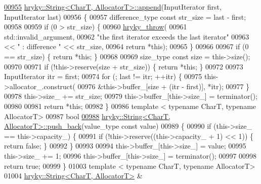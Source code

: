 \begin{DoxyCode}
\hypertarget{string_8h_source_l00955}{}\hyperlink{classhryky_1_1_string_a6ef06ff34990a702f16c422d8080e40d}{00955} \hyperlink{classhryky_1_1_string}{hryky::String<CharT, AllocatorT>::append}(InputIterator first, InputIterator 
      last)
00956 \{
00957     difference\_type \textcolor{keyword}{const} str\_size = last - first;
00958 
00959     \textcolor{keywordflow}{if} (0 > str\_size) \{
00960         \hyperlink{debug__common_8h_af50606eac4009921527ddcaed392b2c2}{hryky_throw}(
00961             std::invalid\_argument,
00962             \textcolor{stringliteral}{"the first iterator exceeds the last iterator"}
00963             << \textcolor{stringliteral}{" : difference "} << str\_size,
00964             \textcolor{keywordflow}{return} *\textcolor{keyword}{this});
00965     \}
00966     
00967     \textcolor{keywordflow}{if} (0 == str\_size) \{ \textcolor{keywordflow}{return} *\textcolor{keyword}{this}; \}
00968 
00969     size\_type \textcolor{keyword}{const} size = this->size();
00970 
00971     \textcolor{keywordflow}{if} (!this->reserve(size + str\_size)) \{ \textcolor{keywordflow}{return} *\textcolor{keyword}{this}; \}
00972 
00973     InputIterator itr = first;
00974     \textcolor{keywordflow}{for} (; last != itr; ++itr) \{
00975         this->allocator\_.construct(
00976             &this->buffer\_[size + (itr - first)], *itr);
00977     \}
00978     this->size\_ += str\_size;
00979     this->buffer\_[this->size\_] = terminator();
00980 
00981     \textcolor{keywordflow}{return} *\textcolor{keyword}{this};
00982 \}
00986 \textcolor{keyword}{template} < \textcolor{keyword}{typename} CharT, \textcolor{keyword}{typename} AllocatorT>
00987 \textcolor{keywordtype}{bool}
\hypertarget{string_8h_source_l00988}{}\hyperlink{classhryky_1_1_string_a0e5eea4617e8a71510a1e34958b0d189}{00988} \hyperlink{classhryky_1_1_string}{hryky::String<CharT, AllocatorT>::push_back}(value\_type \textcolor{keyword}{const} value)
00989 \{
00990     \textcolor{keywordflow}{if} (this->size\_ == this->capacity\_) \{
00991         \textcolor{keywordflow}{if} (!this->reserve((this->capacity\_ + 1) << 1)) \{ \textcolor{keywordflow}{return} \textcolor{keyword}{false}; \}
00992     \}
00993 
00994     this->buffer\_[this->size\_] = value;
00995     this->size\_ += 1;
00996     this->buffer\_[this->size\_] = terminator();
00997 
00998     \textcolor{keywordflow}{return} \textcolor{keyword}{true};
00999 \}
01003 \textcolor{keyword}{template} < \textcolor{keyword}{typename} CharT, \textcolor{keyword}{typename} AllocatorT>
01004 \hyperlink{classhryky_1_1_string}{hryky::String<CharT, AllocatorT>} &

\end{DoxyCode}
